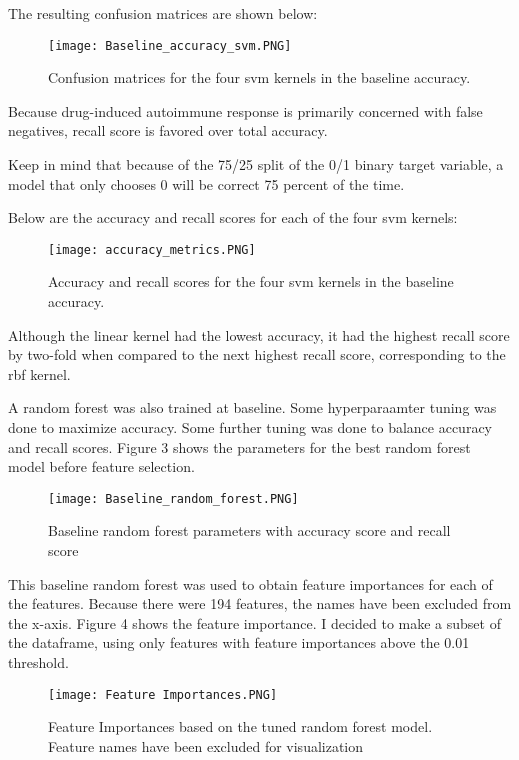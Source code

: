 \documentclass{article}
\begin{document}
\begin{itemize}
The resulting confusion matrices are shown below:

\begin{figure}[hbt!]
\texttt{[image: Baseline\_accuracy\_svm.PNG]}
\caption{Confusion matrices for the four svm kernels in the baseline accuracy.}
\end{figure}


Because drug-induced autoimmune response is primarily concerned with false negatives, recall score is favored over total accuracy.\newline


Keep in mind that because of the 75/25 split of the 0/1 binary target variable, a model that only chooses 0 will be correct 75 percent of the time.\newline

Below are the accuracy and recall scores for each of the four svm kernels:
\begin{figure}[hbt!]
\texttt{[image: accuracy\_metrics.PNG]}
\caption{Accuracy and recall scores for the four svm kernels in the baseline accuracy.}
\end{figure} \newline

Although the linear kernel had the lowest accuracy, it had the highest recall score by two-fold when compared to the next highest recall score, corresponding to the rbf kernel.

A random forest was also trained at baseline. Some hyperparaamter tuning was done to maximize accuracy. Some further tuning was done to balance accuracy and recall scores. Figure 3 shows the parameters for the best random forest model before feature selection. 

\begin{figure}[hbt!]
\texttt{[image: Baseline\_random\_forest.PNG]}
\caption{Baseline random forest parameters with accuracy score and recall score}
\end{figure}

This baseline random forest was used to obtain feature importances for each of the features. Because there were 194 features, the names have been excluded from the x-axis. Figure 4 shows the feature importance. I decided to make a subset of the dataframe, using only features with feature importances above the 0.01 threshold. 

\begin{figure}[hbt!]
\texttt{[image: Feature Importances.PNG]}
\caption{Feature Importances based on the tuned random forest model. Feature names have been excluded for visualization}
\end{figure}


\end{itemize}
\end{document}
